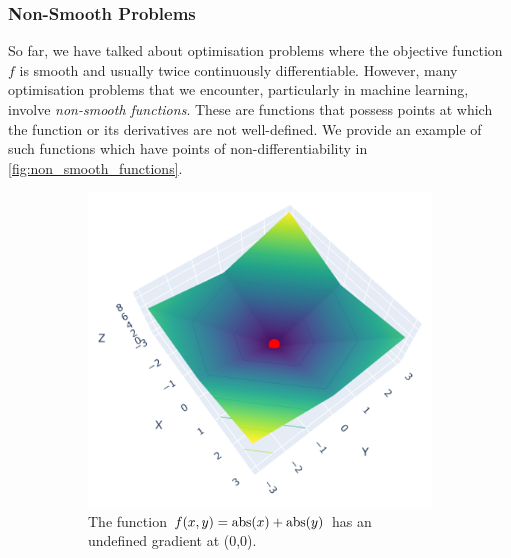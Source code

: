 \subsubsection{Non-Smooth Problems}
\label{sssec:non_smooth_problems}

So far, we have talked about optimisation problems where the objective function $f$ is smooth and usually twice continuously differentiable. However, many optimisation problems that we encounter, particularly in machine learning, involve \textit{non-smooth functions}. These are functions that possess points at which the function or its derivatives are not well-defined. We provide an example of such functions which have points of non-differentiability in \cref{fig:non_smooth_functions}. 

\begin{figure}[h]
    \begin{subfigure}[b]{0.48\linewidth}
        \centering
        \includegraphics[width=\linewidth]{figures/2background/abs_func.png}
        \caption{The function
        $f(x, y) =\operatorname{abs}(x) + \operatorname{abs}(y)$ has an undefined gradient at (0,0).}
        \label{fig:abs_function}
    \end{subfigure}
    \hfill
    \begin{subfigure}[b]{0.48\linewidth}
        \centering

\end{subfigure}
\end{figure}
